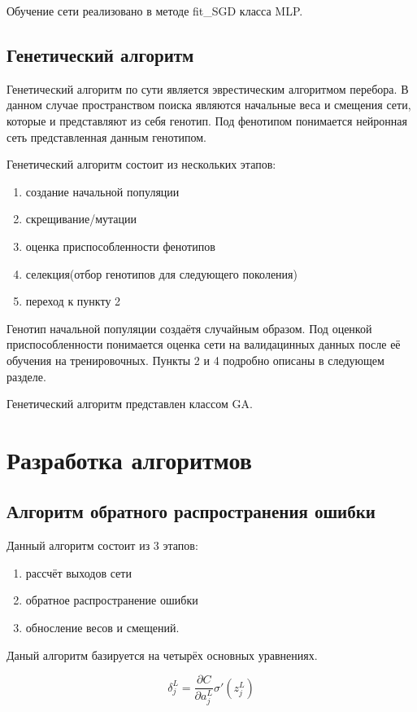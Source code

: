 \documentclass[a4paper,12pt]{article}
\begin{document}
Обучение сети реализовано в методе fit\_SGD класса MLP.
\subsection{Генетический алгоритм}
Генетический алгоритм по сути является эврестическим алгоритмом перебора. В данном случае пространством поиска являются начальные веса и смещения сети, которые и представляют из себя генотип. Под фенотипом понимается нейронная сеть представленная данным генотипом.

Генетический алгоритм состоит из нескольких этапов:
\begin{enumerate}
\item создание начальной популяции
\item скрещивание/мутации
\item оценка приспособленности фенотипов
\item селекция(отбор генотипов для следующего поколения)
\item переход к пункту 2
\end{enumerate}

Генотип начальной популяции создаётя случайным образом. Под оценкой приспособленности понимается оценка сети на валидацинных данных после её обучения на тренировочных. Пункты 2 и 4 подробно описаны в следующем разделе.

Генетический алгоритм представлен классом GA.

\newpage\section{Разработка алгоритмов}

\subsection{Алгоритм обратного распространения ошибки}
Данный алгоритм состоит из 3 этапов:
\begin{enumerate}
\item рассчёт выходов сети
\item обратное распространение ошибки 
\item обносление весов и смещений.
\end{enumerate}



Даный алгоритм базируется на четырёх основных уравнениях.

{\large $$ \delta^L_j = \frac{\partial C}{\partial a^L_j} \sigma'(z^L_j)$$}
\end{document}
